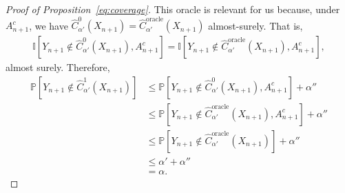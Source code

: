 \documentclass[11pt]{article}
\renewcommand{\P}[1]{\mathbb{P}\left[#1\right]}
\newcommand{\I}[1]{\mathbb{I}\left[#1\right]}
\begin{document}
\begin{proof}[Proof of Proposition~\ref{eq:coverage}]
This oracle is relevant for us because, under $A^c_{n+1}$, we have $\hat{C}^{0}_{\alpha'}(X_{n+1}) = \hat{C}^{\text{oracle}}_{\alpha'}(X_{n+1})$ almost-surely. That is,
\begin{align*}
  \I{Y_{n+1} \notin \hat{C}^0_{\alpha'}(X_{n+1}), A^c_{n+1}} = \I{Y_{n+1} \notin \hat{C}^{\text{oracle}}_{\alpha'}(X_{n+1}), A^c_{n+1}},
\end{align*}
almost surely. Therefore, 
\begin{align*}
  \P{ Y_{n+1} \notin \hat{C}^1_{\alpha'}(X_{n+1})}
  & \leq \P{ Y_{n+1} \notin \hat{C}^0_{\alpha'}(X_{n+1}), A^c_{n+1}} + \alpha'' \\
  & \leq \P{ Y_{n+1} \notin \hat{C}^{\text{oracle}}_{\alpha'}(X_{n+1}), A^c_{n+1}} + \alpha'' \\
  & \leq \P{ Y_{n+1} \notin \hat{C}^{\text{oracle}}_{\alpha'}(X_{n+1})} + \alpha'' \\
  & \leq \alpha' + \alpha'' \\
  & = \alpha.
\end{align*}

\end{proof}



\clearpage
\end{document}
